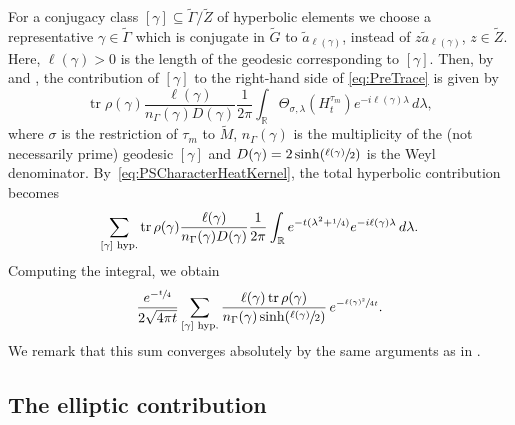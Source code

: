 \documentclass[10pt]{amsart}
\theoremstyle{plain}
\theoremstyle{definition}
\theoremstyle{remark}
\newcommand{\R}{\mathbb{R}}
\DeclareMathOperator{\tr}{tr}
\numberwithin{equation}{section}
\begin{document}
For a conjugacy class $[\gamma]\subseteq\widetilde{\Gamma}/\widetilde{Z}$ of hyperbolic elements we choose a representative $\gamma\in\widetilde{\Gamma}$ which is conjugate in $\widetilde{G}$ to $\widetilde{a}_{\ell(\gamma)}$, instead of $z\widetilde{a}_{\ell(\gamma)}$, $z\in\widetilde{Z}$.
Here, $\ell(\gamma)>0$ is the length of the geodesic corresponding to $[\gamma]$. Then, by \cite[Lem.\,2]{Hof94} and \cite[\S 6]{Wa}, the contribution of $[\gamma]$ to the right-hand side of \cref{eq:PreTrace} is given by
\[
\tr\rho(\gamma)\frac{\ell(\gamma)}{n_\Gamma(\gamma)D(\gamma)}\frac{1}{2\pi}\int_\R \Theta_{\sigma,\lambda}(H_t^{\tau_m})e^{-i\ell(\gamma)\lambda}\,d\lambda,
\]
where $\sigma$ is the restriction of $\tau_m$ to $\widetilde{M}$, $n_{\Gamma}(\gamma)$ is the multiplicity of the (not necessarily prime) geodesic $[\gamma]$ and $D(\gamma) = 2 \sinh(\sfrac {\ell(\gamma)} 2)$ is the Weyl denominator.
By~\cref{eq:PSCharacterHeatKernel}, the total hyperbolic contribution becomes
\[
\sum_{[\gamma]\textup{ hyp.}}\tr\rho(\gamma)\frac{\ell(\gamma)}{n_\Gamma(\gamma)D(\gamma)}\frac{1}{2\pi}\int_\R e^{-t(\lambda^2+\sfrac{1}{4})}e^{-i\ell(\gamma)\lambda}\,d\lambda.
\]
Computing the integral,
we obtain
\[
\frac{e^{-\sfrac{t}{4}}}{2\sqrt{4\pi t}}\sum_{[\gamma]\textup{ hyp.}}\frac{\ell(\gamma)\tr\rho(\gamma)}{n_\Gamma(\gamma)\sinh(\sfrac{\ell(\gamma)}{2})}\,e^{-\sfrac{\ell(\gamma)^2}{4t}}.
\]
We remark that this sum converges absolutely by the same arguments as in \cite[Prop.\,4.1.1]{FS}.

\subsection{The elliptic contribution}
\label{subsec:ell}
\end{document}
